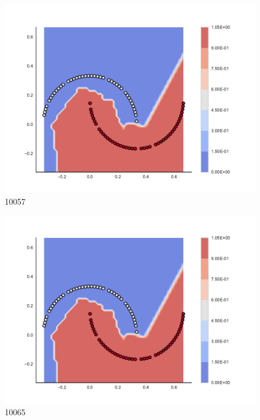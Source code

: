 \begin{subfigure}[b]{0.09\textwidth}
    \includegraphics[clip, trim=2.35cm 1.75cm 4.5cm 0cm,width=\textwidth]{img/convergence/10057.pdf}
    \caption{10057}
    \label{fig:convergence_10057}
\end{subfigure}
%
\begin{subfigure}[b]{0.09\textwidth}
    \includegraphics[clip, trim=2.35cm 1.75cm 4.5cm 0cm,width=\textwidth]{img/convergence/10065.pdf}
    \caption{10065}
    \label{fig:convergence_10065}
\end{subfigure}
%
